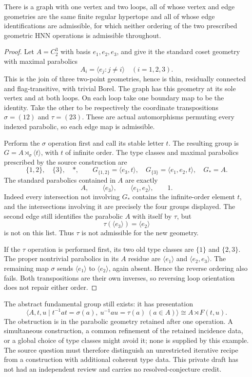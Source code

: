 \begin{proposition}
There is a graph with one vertex and two loops, all of whose vertex and
edge geometries are the same finite regular hypertope and all of whose
edge identifications are admissible, for which neither ordering of the
two prescribed geometric HNN operations is admissible throughout.
\end{proposition}
\begin{proof}
Let $A=C_2^3$ with basis $e_1,e_2,e_3$, and give it the standard coset
geometry with maximal parabolics
\[
 A_i=\langle e_j:j\ne i\rangle\quad(i=1,2,3).
\]
This is the join of three two-point geometries, hence is thin,
residually connected and flag-transitive, with trivial Borel.
The graph has this geometry at its sole vertex and at both loops.
On each loop take one boundary map to be the identity. Take the other
to be respectively the coordinate transpositions
$\sigma=(12)$ and $\tau=(23)$. These are actual automorphisms
permuting every indexed parabolic, so each edge map is admissible.

Perform the $\sigma$ operation first and call its stable letter $t$.
The resulting group is $G=A\rtimes_\sigma\langle t\rangle$, with
$t$ of infinite order. The type classes and maximal parabolics prescribed
by the source construction are
\[
 \{1,2\},\quad\{3\},\quad *,\qquad
 G_{\{1,2\}}=\langle e_3,t\rangle,
 \quad G_{\{3\}}=\langle e_1,e_2,t\rangle,
 \quad G_*=A.
\]
The standard parabolics contained in $A$ are exactly
\[
 A,\qquad \langle e_3\rangle,\qquad
 \langle e_1,e_2\rangle,\qquad 1.
\]
Indeed every intersection not involving $G_*$ contains the infinite-order
element $t$, and the intersections involving it are precisely the four
groups displayed. The second edge still identifies the parabolic $A$
with itself by $\tau$, but
\[
 \tau(\langle e_3\rangle)=\langle e_2\rangle
\]
is not on this list. Thus $\tau$ is not admissible for the new geometry.

If the $\tau$ operation is performed first, its two old type classes
are $\{1\}$ and $\{2,3\}$. The proper nontrivial parabolics in its
$A$ residue are $\langle e_1\rangle$ and $\langle e_2,e_3\rangle$.
The remaining map $\sigma$ sends $\langle e_1\rangle$ to
$\langle e_2\rangle$, again absent. Hence the reverse ordering also
fails. Both transpositions are their own inverses, so reversing loop
orientation does not repair either order.
\end{proof}

The abstract fundamental group still exists: it has presentation
\[
 \langle A,t,u\mid t^{-1}at=\sigma(a),\ u^{-1}au=\tau(a)
 \ (a\in A)\rangle
 \cong A\rtimes F(t,u).
\]
The obstruction is in the parabolic geometry retained after one operation.
A simultaneous construction, a common refinement of the retained incidence
data, or a global choice of type classes might avoid it; none is supplied
by this example. The source question must therefore distinguish an
unrestricted iterative recipe from a construction with additional coherent
type data. This private draft has not had an independent review and carries
no resolved-conjecture credit.

